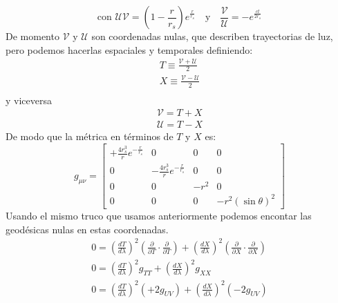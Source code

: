 \begin{equation}
    \text{con } \mathcal{U}\mathcal{V} = \left(1-\frac{r}{r_s}\right)e^{\frac{r}{r_s}} \quad \text{y} \quad \frac{\mathcal{V}}{\mathcal{U}} = -e^{\frac{ct}{2r_s}}
\end{equation}
De momento $\mathcal{V}$ y $\mathcal{U}$ son coordenadas nulas, que describen trayectorias de luz, pero podemos hacerlas espaciales y temporales definiendo:
\begin{equation}
    \begin{aligned}
        T \equiv \frac{\mathcal{V}+\mathcal{U}}{2} \\
        X \equiv \frac{\mathcal{V}-\mathcal{U}}{2} \\
    \end{aligned}
\end{equation}
y viceversa
\begin{equation}
    \begin{aligned}
        \mathcal{V}=T+X \\
        \mathcal{U}=T-X
    \end{aligned}
\end{equation}
De modo que la métrica en términos de $T$ y $X$ es:
\begin{equation}
        g_{\mu \nu} =\left[\begin{array}{cccc}
                                             +\frac{4 r_s^3}{r} e^{-\frac{r}{r_s}} & 0                                     & 0    & 0                   \\
                                             0                                     & -\frac{4 r_s^3}{r} e^{-\frac{r}{r_s}} & 0    & 0                   \\
                                             0                                     & 0                                     & -r^2 & 0                   \\
                                             0                                     & 0                                     & 0    & -r^2(\sin \theta)^2
                                         \end{array}\right]
\end{equation}
Usando el mismo truco que usamos anteriormente podemos encontar las geodésicas nulas en estas coordenadas.
\begin{equation}
    \begin{array}{l}
        0=\left(\frac{d T}{d \lambda}\right)^2\left(\frac{\partial}{\partial T} \cdot \frac{\partial}{\partial T}\right)+\left(\frac{d X}{d \lambda}\right)^2\left(\frac{\partial}{\partial X} \cdot \frac{\partial}{\partial X}\right) \\
        0=\left(\frac{d T}{d \lambda}\right)^2 g_{T T}+\left(\frac{d X}{d \lambda}\right)^2 g_{X X}                                                                                                                                     \\
        0=\left(\frac{d T}{d \lambda}\right)^2\left(+2 g_{U V}\right)+\left(\frac{d X}{d \lambda}\right)^2\left(-2 g_{U V}\right)
    \end{array}
\end{equation}

